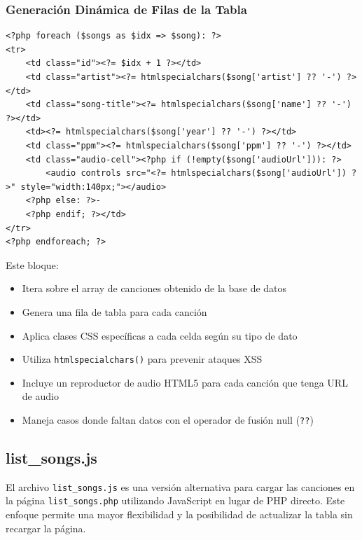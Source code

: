 \documentclass[a4paper,12pt]{article}
\begin{document}
\subsubsection{Generación Dinámica de Filas de la Tabla}
\begin{verbatim}
<?php foreach ($songs as $idx => $song): ?>
<tr>
    <td class="id"><?= $idx + 1 ?></td>
    <td class="artist"><?= htmlspecialchars($song['artist'] ?? '-') ?></td>
    <td class="song-title"><?= htmlspecialchars($song['name'] ?? '-') ?></td>
    <td><?= htmlspecialchars($song['year'] ?? '-') ?></td>
    <td class="ppm"><?= htmlspecialchars($song['ppm'] ?? '-') ?></td>
    <td class="audio-cell"><?php if (!empty($song['audioUrl'])): ?>
        <audio controls src="<?= htmlspecialchars($song['audioUrl']) ?>" style="width:140px;"></audio>
    <?php else: ?>-
    <?php endif; ?></td>
</tr>
<?php endforeach; ?>
\end{verbatim}
Este bloque:
\begin{itemize}
    \item Itera sobre el array de canciones obtenido de la base de datos
    \item Genera una fila de tabla para cada canción
    \item Aplica clases CSS específicas a cada celda según su tipo de dato
    \item Utiliza \texttt{htmlspecialchars()} para prevenir ataques XSS
    \item Incluye un reproductor de audio HTML5 para cada canción que tenga URL de audio
    \item Maneja casos donde faltan datos con el operador de fusión null (\texttt{??})
\end{itemize}

\subsection{list\_songs.js}
El archivo \texttt{list\_songs.js} es una versión alternativa para cargar las canciones en la página \texttt{list\_songs.php} utilizando JavaScript en lugar de PHP directo. Este enfoque permite una mayor flexibilidad y la posibilidad de actualizar la tabla sin recargar la página.
\end{document}
